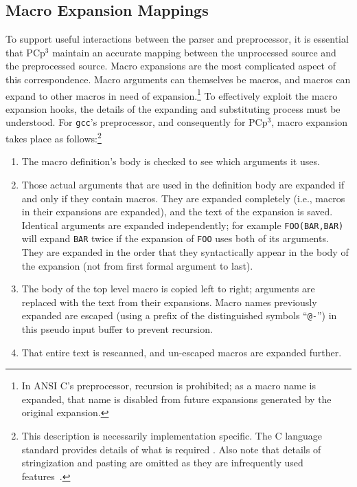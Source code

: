 \documentclass{article}
\newcommand{\pcp}{\mbox{\textsf{PCp}$^3$}}
\newcommand{\C}{\mbox{C}}
\newcommand{\ie}{i.e.,}
\begin{document}
\subsection{Macro Expansion Mappings}
\label{ssec:macro_exp_map}
To support useful interactions between the parser and preprocessor, it
is essential that \pcp{} maintain an accurate mapping between the
unprocessed source and the preprocessed source.  Macro expansions are
the most complicated aspect of this correspondence.  Macro arguments can
themselves be macros, and macros can expand to other macros in need of
expansion.\footnote{In ANSI \C{}'s preprocessor, recursion is
  prohibited; as a macro name is expanded, that name is disabled from
  future expansions generated by the original expansion.}  To
effectively exploit the macro expansion hooks, the details of the
expanding and substituting process must be understood.  For
\texttt{gcc}'s preprocessor, and consequently for \pcp{}, macro
expansion takes place as follows:\footnote{This description is necessarily
  implementation specific.  The \C{} language standard provides details
of what is required \cite[Ch.~3]{Harbison91}.  Also note that
  details of stringization and pasting are omitted as they are
  infrequently used features~\cite{EmpCpp}.}

\begin{enumerate}
\item The macro definition's body is checked to see which arguments it uses.
\item Those actual arguments that are used in the definition body are
      expanded if and only if they contain macros.  They are expanded
      completely (\ie{} macros in their expansions are expanded), and
      the text of the expansion is saved.  Identical arguments are
      expanded independently; for example \texttt{FOO(BAR,BAR)} will
      expand \texttt{BAR} twice if the expansion of \texttt{FOO} uses
      both of its arguments.  They are expanded in the order that they
      syntactically appear in the body of the expansion (not from first formal
      argument to last).
\item The body of the top level macro is copied left to right; arguments
      are replaced with the text from their expansions.  Macro names
      previously expanded are escaped (using a prefix of the
      distinguished symbols ``\texttt{@-}'') in this pseudo input buffer
      to prevent recursion.
\item That entire text is rescanned, and un-escaped macros are expanded
      further.
\end{enumerate}
\end{document}
